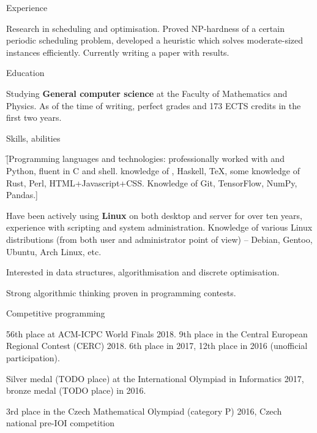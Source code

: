 

\newdimen\vyska
\vyska=1.5cm


\sekce Experience

 Research in scheduling
and optimisation. Proved NP-hardness of a certain periodic scheduling problem,
developed a heuristic which solves moderate-sized instances efficiently.
Currently writing a paper with results.

\sekce Education


Studying {\bf General computer science} at the Faculty of Mathematics and
Physics. As of the time of writing, perfect grades and 173 ECTS credits in the
first two years.

\sekce Skills, abilities

\f[Programming languages and technologies: professionally worked with \Cpp and
Python, fluent in C and shell. knowledge of \Cis, Haskell, \TeX, some knowledge
of Rust, Perl, HTML+Javascript+CSS.
Knowledge of Git, TensorFlow, NumPy, Pandas.]

Have been actively using {\bf Linux} on both desktop and server for over ten
years, experience with scripting and system administration. Knowledge of
various Linux distributions (from both user and administrator point of view) –
Debian, Gentoo, Ubuntu, Arch Linux, etc.

Interested in data structures, algorithmisation and discrete optimisation.

Strong algorithmic thinking proven in programming contests.

\sekce Competitive programming

56th place at ACM-ICPC World Finals 2018. 9th place in the Central European
Regional Contest (CERC) 2018. 6th place in 2017, 12th place in 2016 (unofficial
participation).

Silver medal (TODO place) at the International Olympiad in Informatics 2017,
bronze medal (TODO place) in 2016.

3rd place in the Czech Mathematical Olympiad (category P) 2016, Czech national
pre-IOI competition

